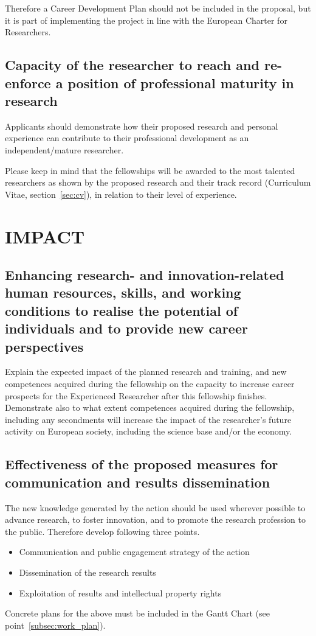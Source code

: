 \documentclass[a4paper,11pt]{article}
\begin{document}
Therefore a Career Development Plan should not be included in the proposal, but it is part of implementing the project in line with the European Charter for Researchers.

\subsection{Capacity of the researcher to reach and re-enforce a position of professional maturity in research}
\label{sec:maturity}

Applicants should demonstrate how their proposed research and personal experience can contribute to their professional development as an independent/mature researcher.

Please keep in mind that the fellowships will be awarded to the most talented researchers as shown by the proposed research and their track record (Curriculum Vitae, section~\ref{sec:cv}), in relation to their level of experience.

\section{IMPACT}
\label{sec:impact}

\subsection{Enhancing research- and innovation-related human resources, skills, and working conditions to realise the potential of individuals and to provide new career perspectives}
\label{sec:enhancement}

Explain the expected impact of the planned research and training, and new competences acquired during the fellowship on the capacity to increase career prospects for the Experienced Researcher after this fellowship finishes.
Demonstrate also to what extent competences acquired during the fellowship, including any secondments will increase the impact of the researcher’s future activity on European society, including the science base and/or the economy.  

\subsection{Effectiveness of the proposed measures for communication and results dissemination}

The new knowledge generated by the action should be used wherever possible to
advance research, to foster innovation, and to promote the research profession
to the public. Therefore develop following three points.
\begin{itemize}
\item Communication and public engagement strategy of the action 
\item Dissemination of the research results 
\item Exploitation of results and intellectual property rights
\end{itemize}
Concrete plans for the above must be included in the Gantt Chart (see point~\ref{subsec:work_plan}).
\end{document}

